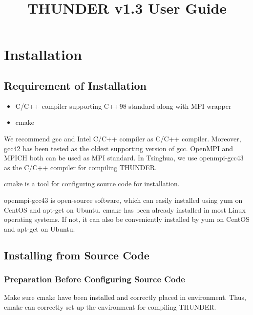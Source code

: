 \documentclass{article}
\begin{document}
    \title{THUNDER v1.3 User Guide}
    \maketitle
    
    \section{Installation}
    
        \subsection{Requirement of Installation}
        
            \begin{itemize}
                \item C/C++ compiler supporting C++98 standard along with MPI wrapper
                \item \textsf{cmake}
            \end{itemize}
            
            We recommend \textsf{gcc} and Intel C/C++ compiler as C/C++ compiler. Moreover, \textsf{gcc42} has been tested as the oldest supporting version of \textsf{gcc}. OpenMPI and MPICH both can be used as MPI standard. In Tsinghua, we use \textsf{openmpi-gcc43} as the C/C++ compiler for compiling THUNDER.
            
            \textsf{cmake} is a tool for configuring source code for installation.
            
            \textsf{openmpi-gcc43} is open-source software, which can easily installed using \textsf{yum} on CentOS and \textsf{apt-get} on Ubuntu. \textsf{cmake} has been already installed in most Linux operating systems. If not, it can also be conveniently installed by \textsf{yum} on CentOS and \textsf{apt-get} on Ubuntu.
        
        \subsection{Installing from Source Code}
        
            \subsubsection{Preparation Before Configuring Source Code}
            
                Make sure \textsf{cmake} have been installed and correctly placed in environment. Thus, \textsf{cmake} can correctly set up the environment for compiling THUNDER.
        
\end{document}
